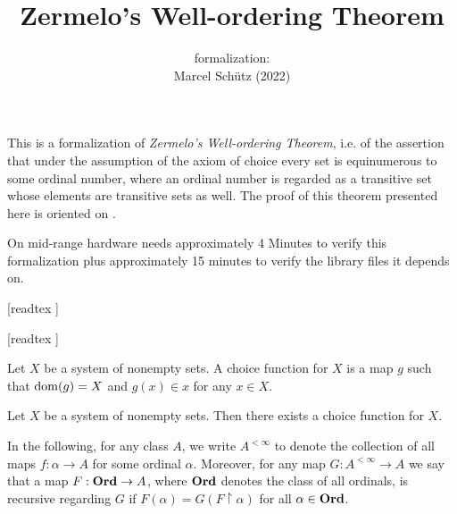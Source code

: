 \documentclass{article}
\title{Zermelo's Well-ordering Theorem}
\author{\Naproche formalization: \vspace{0.5em} \\
Marcel Schütz (2022)}
\date{}
\begin{document}
  \maketitle

  \noindent This is a formalization of \textit{Zermelo's Well-ordering Theorem},
  i.e. of the assertion that under the assumption of the axiom of choice every
  set is equinumerous to some ordinal number, where an ordinal number is
  regarded as a transitive set whose elements are transitive sets as well.
  The proof of this theorem presented here is oriented on \cite{Koepke2018}.

  On mid-range hardware \Naproche needs approximately 4 Minutes to verify this
  formalization plus approximately 15 minutes to verify the library files it
  depends on.

  \begin{forthel}

    [readtex ]

    [readtex ]

  \end{forthel}

  \begin{forthel}
    \begin{definition*}
      Let $X$ be a system of nonempty sets.
      A choice function for $X$ is a map $g$ such that $\operatorname{dom}(g) = X$ and
      $g(x) \in x$ for any $x \in X$.
    \end{definition*}

    \begin{axiom*}[Choice]
      Let $X$ be a system of nonempty sets.
      Then there exists a choice function for $X$.
    \end{axiom*}
  \end{forthel}

  \noindent In the following, for any class $A$, we write $A^{< \infty}$ to
  denote the collection of all maps $f : \alpha \to A$ for some ordinal
  $\alpha$.
  Moreover, for any map $G : A^{< \infty} \to A$ we say that a map $F : \textbf{Ord} \to
  A$, where $\textbf{Ord}$ denotes the class of all ordinals, is recursive regarding $G$
  if $F(\alpha) = G(F \restriction \alpha)$ for all $\alpha \in \textbf{Ord}$.
\end{document}
